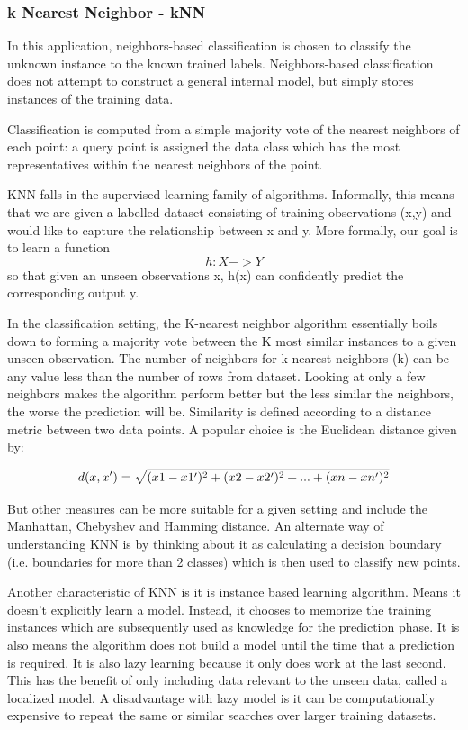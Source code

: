 \documentclass[sigconf]{acmart}
\begin{document}
\subsubsection{k Nearest Neighbor - kNN}
\cite{Kevin2016} In this application, neighbors-based classification is chosen to classify the unknown instance to the known trained labels. Neighbors-based classification does not attempt to construct a general internal model, but simply stores instances of the training data.


Classification is computed from a simple majority vote of the nearest neighbors of each point: a query point is assigned the data class which has the most representatives within the nearest neighbors of the point.


KNN falls in the supervised learning family of algorithms. Informally, this means that we are given a labelled dataset consisting of training observations (x,y) and would like to capture the relationship between x and y. More formally, our goal is to learn a function \[h:X ->Y\] so that given an unseen observations x, h(x) can confidently predict the corresponding output y.


In the classification setting, the K-nearest neighbor algorithm essentially boils down to forming a majority vote between the K most similar instances to a given unseen observation.
The number of neighbors for k-nearest neighbors (k) can be any value less than the number of rows from dataset. Looking at only a few neighbors makes the algorithm perform better but the less similar the neighbors, the worse the prediction will be. Similarity is defined according to a distance metric between two data points. A popular choice is the Euclidean distance given by:


\[
d(x,x')=\sqrt{(x1-x1\rq)^2+(x2-x2\rq)^2+...+(xn-xn\rq)^2}
\]


But other measures can be more suitable for a given setting and include the Manhattan, Chebyshev and Hamming distance. 
An alternate way of understanding KNN is by thinking about it as calculating a decision boundary (i.e. boundaries for more than 2 classes) which is then used to classify new points.

Another characteristic of KNN is it is instance based learning algorithm. Means it doesn't explicitly learn a model. Instead, it chooses to memorize the training instances which are subsequently used as knowledge for the prediction phase.  It is also means the algorithm does not build a model until the time that a prediction is required. It is also lazy learning because it only does work at the last second. This has the benefit of only including data relevant to the unseen data, called a localized model. A disadvantage with lazy model is it can be computationally expensive to repeat the same or similar searches over larger training datasets. 
\end{document}
